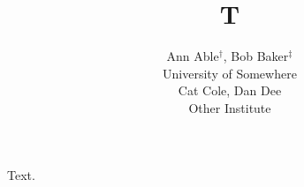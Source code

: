 \documentclass{article}
\begin{document}
\title{T}
\author{Ann Able$^{\dag}$, Bob Baker$^{\ddag}$\\ University of Somewhere\\ Cat Cole, Dan Dee\\ Other Institute}
\maketitle
Text.
\end{document}
